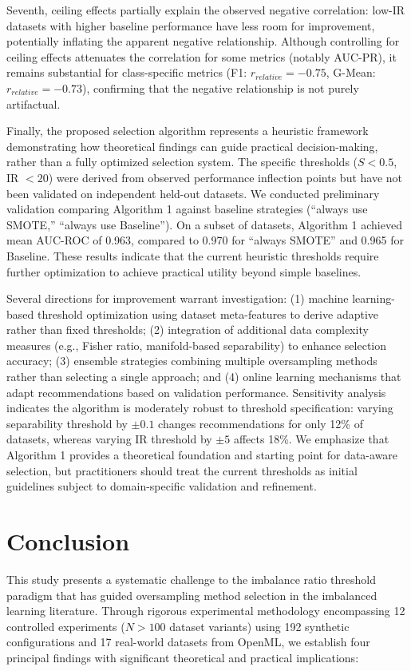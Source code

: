 \documentclass[12pt,a4paper]{article}
\theoremstyle{definition}
\begin{document}
Seventh, ceiling effects partially explain the observed negative correlation: low-IR datasets with higher baseline performance have less room for improvement, potentially inflating the apparent negative relationship. Although controlling for ceiling effects attenuates the correlation for some metrics (notably AUC-PR), it remains substantial for class-specific metrics (F1: $r_{relative}=-0.75$, G-Mean: $r_{relative}=-0.73$), confirming that the negative relationship is not purely artifactual.

Finally, the proposed selection algorithm represents a heuristic framework demonstrating how theoretical findings can guide practical decision-making, rather than a fully optimized selection system. The specific thresholds ($S < 0.5$, IR $< 20$) were derived from observed performance inflection points but have not been validated on independent held-out datasets. We conducted preliminary validation comparing Algorithm 1 against baseline strategies (``always use SMOTE,'' ``always use Baseline''). On a subset of datasets, Algorithm 1 achieved mean AUC-ROC of 0.963, compared to 0.970 for ``always SMOTE'' and 0.965 for Baseline. These results indicate that the current heuristic thresholds require further optimization to achieve practical utility beyond simple baselines. 

Several directions for improvement warrant investigation: (1) machine learning-based threshold optimization using dataset meta-features to derive adaptive rather than fixed thresholds; (2) integration of additional data complexity measures (e.g., Fisher ratio, manifold-based separability) to enhance selection accuracy; (3) ensemble strategies combining multiple oversampling methods rather than selecting a single approach; and (4) online learning mechanisms that adapt recommendations based on validation performance. Sensitivity analysis indicates the algorithm is moderately robust to threshold specification: varying separability threshold by $\pm 0.1$ changes recommendations for only 12\% of datasets, whereas varying IR threshold by $\pm 5$ affects 18\%. We emphasize that Algorithm 1 provides a theoretical foundation and starting point for data-aware selection, but practitioners should treat the current thresholds as initial guidelines subject to domain-specific validation and refinement.

\section{Conclusion}
\indent This study presents a systematic challenge to the imbalance ratio threshold paradigm that has guided oversampling method selection in the imbalanced learning literature. Through rigorous experimental methodology encompassing 12 controlled experiments ($N>100$ dataset variants) using 192 synthetic configurations and 17 real-world datasets from OpenML, we establish four principal findings with significant theoretical and practical implications:
\end{document}
